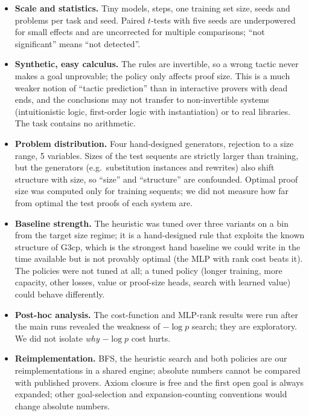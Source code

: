 \begin{itemize}
\item \textbf{Scale and statistics.} Tiny models,  steps, one training set size,  seeds and  problems per task and seed. Paired $t$-tests with five seeds are underpowered for small effects and are uncorrected for multiple comparisons; ``not significant'' means ``not detected''.
\item \textbf{Synthetic, easy calculus.} The rules are invertible, so a wrong tactic never makes a goal unprovable; the policy only affects proof size. This is a much weaker notion of ``tactic prediction'' than in interactive provers with dead ends, and the conclusions may not transfer to non-invertible systems (intuitionistic logic, first-order logic with instantiation) or to real libraries. The task contains no arithmetic.
\item \textbf{Problem distribution.} Four hand-designed generators, rejection to a size range, 5 variables. Sizes of the test sequents are strictly larger than training, but the generators (e.g.\ substitution instances and rewrites) also shift structure with size, so ``size'' and ``structure'' are confounded. Optimal proof size was computed only for training sequents; we did not measure how far from optimal the test proofs of each system are.
\item \textbf{Baseline strength.} The heuristic was tuned over three variants on a bin from the target size regime; it is a hand-designed rule that exploits the known structure of G3cp, which is the strongest hand baseline we could write in the time available but is not provably optimal (the MLP with rank cost beats it). The policies were not tuned at all; a tuned policy (longer training, more capacity, other losses, value or proof-size heads, search with learned value) could behave differently.
\item \textbf{Post-hoc analysis.} The cost-function and MLP-rank results were run after the main runs revealed the weakness of $-\log p$ search; they are exploratory. We did not isolate \emph{why} $-\log p$ cost hurts.
\item \textbf{Reimplementation.} BFS, the heuristic search and both policies are our reimplementations in a shared engine; absolute numbers cannot be compared with published provers. Axiom closure is free and the first open goal is always expanded; other goal-selection and expansion-counting conventions would change absolute numbers.
\end{itemize}
